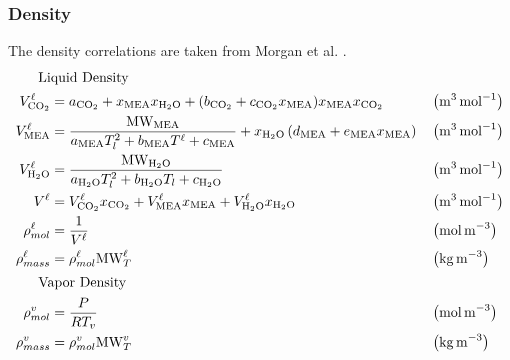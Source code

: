             \subsubsection{Density}
                The density correlations are taken from Morgan et al. \cite{Morgan2015}.
                \begin{align}
                    \shortintertext{\quad\; Liquid Density}
                    V^{\liq}_{\COtwo} &=  a_{\COtwo} + x_{\MEA} x_{\HtwoO} + (b_{\COtwo} + c_{\COtwo} x_{\MEA}) x_{\MEA} x_{\COtwo}
                    && \left(\unit{m^{3}\,mol^{-1}}\right)\\
                    V^{\liq}_{\MEA} &=  \frac{\text{MW}_{\MEA}}{a_{\MEA} T_l^2 + b_{\MEA} T^{\liq} + c_{\MEA}} + x_{\HtwoO}\left(d_{\MEA} + e_{\MEA}x_{\MEA} \right)
                    && \left(\unit{m^{3}\,mol^{-1}}\right)\\
                    V^{\liq}_{\HtwoO} &=  \frac{\text{MW}_{\HtwoO}}{a_{\HtwoO} T_l^2 + b_{\HtwoO} T_l + c_{\HtwoO}}
                    && \left(\unit{m^{3}\,mol^{-1}}\right)\\
                    V^{\liq} &= V^{\liq}_{\COtwo}x_{\COtwo} + V^{\liq}_{\MEA}x_{\MEA} + V^{\liq}_{\HtwoO}x_{\HtwoO}
                    && \left(\unit{m^{3}\,mol^{-1}}\right)\\
                    \rho ^{\liq}_{mol} &= \frac{1}{V^{\liq}}
                    && \left(\unit{mol\,m^{-3}}\right)\\
                    \rho ^{\liq}_{mass} &= \rho ^{\liq}_{mol}\text{MW}^{\liq}_{T}
                    && \left(\unit{kg\,m^{-3}}\right)\\
                    \shortintertext{\quad\; Vapor Density}
                    \rho ^{\vap}_{mol} &= \frac{P}{RT_v}
                    && \left(\unit{mol\,m^{-3}}\right)\\
                    \rho ^{\vap}_{mass} &= \rho ^{\vap}_{mol}\text{MW}^{\vap}_{T}
                    && \left(\unit{kg\,m^{-3}}\right)
                \end{align}

